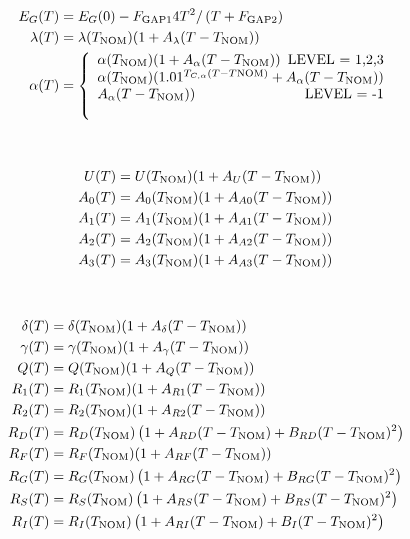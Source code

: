 ~

\begin{align}
E_G(T) & =  E_G(0) -
      F_{\ms{GAP1}}{{4T^2} / \left( {T+F_{\ms{GAP2}}} \right) }\\
\lambda(T) &= \lambda(T_{\ms{NOM}})(1 + A_{\lambda}(T-T_{\ms{NOM}} )) \\
\alpha(T) &= \left\{ \begin{array}{l}
              \alpha(T_{\ms{NOM}})(1 + A_{\alpha}(T-T_{\ms{NOM}} ))
          \hspace*{\fill} \mbox{LEVEL = 1,2,3}\\
              \alpha(T_{\ms{NOM}})(1.01^
          {T_{C,\alpha}(T-T{\ms{NOM}})} + A_{\alpha}(T-T_{\ms{NOM}} )) \\
          A_{\alpha}(T-T_{\ms{NOM}} ))
          \hspace*{\fill} \mbox{LEVEL = -1}\\
           \\ \end{array}
          \right. %
\end{align}

~

\begin{align}
U(T) &= U(T_{\mbox{\scriptsize NOM}})(1 + A_{U}(T-T_{\mbox{\scriptsize NOM}} )) \\
A_0(T) &= A_0(T_{\mbox{\scriptsize NOM}})(1 + A_{A0}(T-T_{\mbox{\scriptsize NOM}} )) \\
A_1(T) &= A_1(T_{\mbox{\scriptsize NOM}})(1 + A_{A1}(T-T_{\mbox{\scriptsize NOM}} )) \\
A_2(T) &= A_2(T_{\mbox{\scriptsize NOM}})(1 + A_{A2}(T-T_{\mbox{\scriptsize NOM}} ))\\
A_3(T) &= A_3(T_{\mbox{\scriptsize NOM}})(1 + A_{A3}(T-T_{\mbox{\scriptsize NOM}} ))
\end{align}

~

\begin{align}
\delta(T) &= \delta(T_{\mbox{\scriptsize NOM}})(1 + A_{\delta}(T-T_{\mbox{\scriptsize NOM}} )) \\
\gamma(T) &= \gamma(T_{\mbox{\scriptsize NOM}})(1 + A_{\gamma}(T-T_{\mbox{\scriptsize NOM}} )) \\
Q(T) &= Q(T_{\mbox{\scriptsize NOM}})(1 + A_{Q}(T-T_{\mbox{\scriptsize NOM}} ))\\
R_1(T) &= R_1(T_{\mbox{\scriptsize NOM}})(1 + A_{R1}(T-T_{\mbox{\scriptsize NOM}} )) \\
R_2(T) &= R_2(T_{\mbox{\scriptsize NOM}})(1 + A_{R2}(T-T_{\mbox{\scriptsize NOM}} )) \\
R_D(T) & =  R_D(T_{\mbox{\scriptsize NOM}}) \left( 1 + A_{RD} (T-T_{\mbox{\scriptsize NOM}})
                                    + B_{RD}(T-T_{\mbox{\scriptsize NOM}})^2 \right)\\
R_F(T) &= R_F(T_{\mbox{\scriptsize NOM}})(1 + A_{RF}(T-T_{\mbox{\scriptsize NOM}} )) \\
R_G(T) & =  R_G(T_{\mbox{\scriptsize NOM}}) \left( 1 + A_{RG}(T-T_{\mbox{\scriptsize NOM}})
                                    + B_{RG}(T-T_{\mbox{\scriptsize NOM}})^2 \right)\\
R_S(T) & =  R_S(T_{\mbox{\scriptsize NOM}}) \left( 1 + A_{RS}(T-T_{\mbox{\scriptsize NOM}})
                                    + B_{RS}(T-T_{\mbox{\scriptsize NOM}})^2 \right)\\
R_I(T) &= R_I(T_{\mbox{\scriptsize NOM}}) \left( 1 + A_{RI}(T-T_{\mbox{\scriptsize NOM}} )
                                    + B_I(T-T_{\mbox{\scriptsize NOM}})^2 \right)
\end{align}

